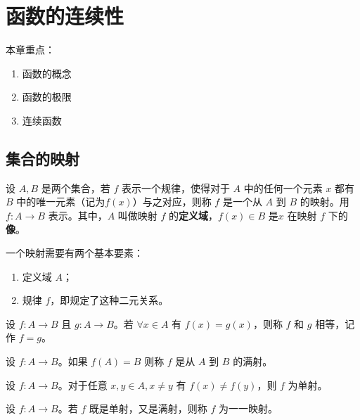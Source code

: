 \chapter{函数的连续性}

本章重点：

\begin{enumerate}
    \item 函数的概念
    \item 函数的极限
    \item 连续函数
\end{enumerate}

\section{集合的映射}

\begin{definition}[映射]
    设 $A,B$ 是两个集合，若 $f$ 表示一个规律，使得对于 $A$ 中的任何一个元素 $x$ 都有 $B$ 中的唯一元素（记为$f(x)$）与之对应，则称 $f$ 是一个从 $A$ 到 $B$ 的映射。用 $f:A\rightarrow B$ 表示。其中，$A$ 叫做映射 $f$ 的\textbf{定义域}，$f(x)\in B$ 是$x$ 在映射 $f$ 下的\textbf{像}。
\end{definition}

\maketip 一个映射需要有两个基本要素：

\begin{enumerate}
    \item 定义域 $A$；
    \item 规律 $f$，即规定了这种二元关系。
\end{enumerate}

\begin{definition}[函数的相等]
    设 $f:A\rightarrow B$ 且 $g:A\rightarrow B$。若 $\forall x\in A$ 有 $f(x) = g(x)$，则称 $f$ 和 $g$ 相等，记作 $f=g$。
\end{definition}

\begin{definition}[满射]
    设 $f:A\rightarrow B$。如果 $f(A) = B$ 则称 $f$ 是从 $A$ 到 $B$ 的满射。
\end{definition}


\begin{definition}[单射]
    设 $f:A\rightarrow B$。对于任意 $x,y\in A,x\ne y$ 有 $f(x) \ne f(y)$，则 $f$ 为单射。
\end{definition}

\begin{definition}[一一映射]
    设 $f:A\rightarrow B$。若 $f$ 既是单射，又是满射，则称 $f$ 为一一映射。
\end{definition}